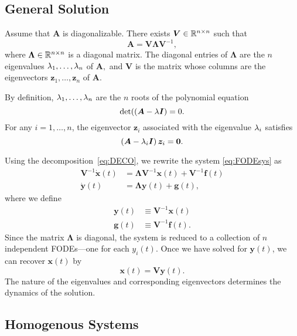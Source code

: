\documentclass[letterpaper,12pt,leqno]{article}
\begin{document}
\subsection{General Solution}

Assume that $\bm{A}$ is diagonalizable. There exists $\bm{V}\in \mathbb{R}^{n\times n}$ such that
\begin{equation}
\bm{A}=\bm{V}\bm{\Lambda}\bm{V}^{-1},\label{eq:DECO}
\end{equation}
where $\bm{\Lambda}\in \mathbb{R}^{n\times n}$ is a diagonal matrix. The diagonal entries of $\bm{\Lambda}$ are the $n$ eigenvalues $\lambda_{1},\ldots,\lambda_{n}$ of $\bm{A},$ and $\bm{V}$ is the matrix whose
columns are the eigenvectors $\bm{z}_{1},\ldots,\bm{z}_{n}$ of $\bm{A}$. 

By definition, $\lambda_{1},\ldots,\lambda_{n}$ are the $n$ roots of the polynomial equation
\begin{equation*}
\det( \left( \bm{A}-\lambda \bm{I} \right) =0.
\end{equation*}
For any $i=1,\dots,n$, the eigenvector $\bm{z}_{i}$ associated with the eigenvalue $\lambda_{i}$ satisfies 
\begin{equation*}
\left( \bm{A}-\lambda_{i} \bm{I} \right) \bm{z}_{i} =\bm{0}.
\end{equation*}


Using the decomposition~\eqref{eq:DECO}, we rewrite the system \eqref{eq:FODEsys} as
\begin{align}
\bm{V}^{-1}\bm{\dot{x}}(t) &=\bm{\Lambda} \bm{V}^{-1}\bm{x}(t) +\bm{V}^{-1}\bm{f}(t)\nonumber\\
\bm{\dot{y}}(t) &=\bm{\Lambda} \bm{y}(t) +\bm{g}(t) ,  \label{eq:FODEsyst}
\end{align}
where we define
\begin{align*}
\bm{y}(t) &\equiv \bm{V}^{-1}\bm{x}(t)\\
\bm{g}(t) &\equiv \bm{V}^{-1}\bm{f}(t).
\end{align*}
Since the matrix $\bm{\Lambda}$ is diagonal, the system is reduced to a collection of $n$ independent FODEs---one for each $y_{i}(t)$. Once we have solved for $\bm{y}(t)$, we can recover $\bm{x}(t)$ by 
\begin{equation*}
\bm{x}(t) =\bm{V} \bm{y}(t) .
\end{equation*}
The nature of the eigenvalues and corresponding eigenvectors determines the dynamics of the solution.

\subsection{Homogenous Systems}
\end{document}
